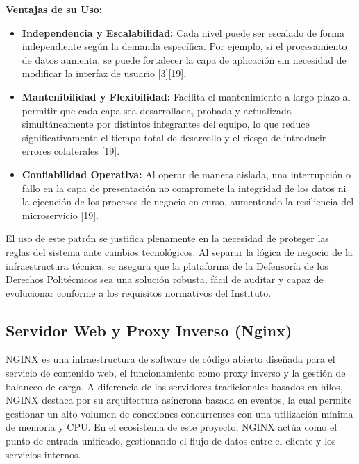 \textbf{Ventajas de su Uso:}
\begin{itemize}
    \item \textbf{Independencia y Escalabilidad:} Cada nivel puede ser escalado de forma independiente según la demanda específica. Por ejemplo, si el procesamiento de datos aumenta, se puede fortalecer la capa de aplicación sin necesidad de modificar la interfaz de usuario [3][19].
    \item \textbf{Mantenibilidad y Flexibilidad:} Facilita el mantenimiento a largo plazo al permitir que cada capa sea desarrollada, probada y actualizada simultáneamente por distintos integrantes del equipo, lo que reduce significativamente el tiempo total de desarrollo y el riesgo de introducir errores colaterales [19].
    \item \textbf{Confiabilidad Operativa:} Al operar de manera aislada, una interrupción o fallo en la capa de presentación no compromete la integridad de los datos ni la ejecución de los procesos de negocio en curso, aumentando la resiliencia del microservicio [19].
\end{itemize}

El uso de este patrón se justifica plenamente en la necesidad de proteger las reglas del sistema ante cambios tecnológicos. Al separar la lógica de negocio de la infraestructura técnica, se asegura que la plataforma de la Defensoría de los Derechos Politécnicos sea una solución robusta, fácil de auditar y capaz de evolucionar conforme a los requisitos normativos del Instituto.

\subsection{Servidor Web y Proxy Inverso (Nginx)}

NGINX es una infraestructura de software de código abierto diseñada para el servicio de contenido web, el funcionamiento como proxy inverso y la gestión de balanceo de carga. A diferencia de los servidores tradicionales basados en hilos, NGINX destaca por su arquitectura asíncrona basada en eventos, la cual permite gestionar un alto volumen de conexiones concurrentes con una utilización mínima de memoria y CPU. En el ecosistema de este proyecto, NGINX actúa como el punto de entrada unificado, gestionando el flujo de datos entre el cliente y los servicios internos.



